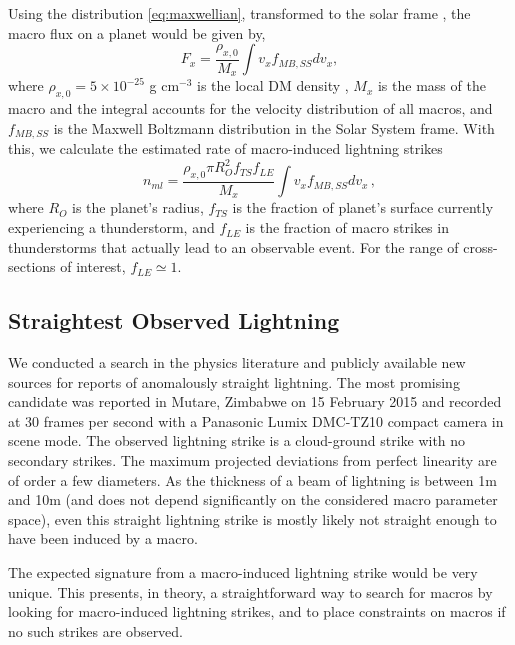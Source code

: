 \documentclass[%
reprint,
 amsmath,amssymb,
 aps,
 prd,
]{revtex4-2}
\begin{document}
    Using the distribution \eqref{eq:maxwellian}, transformed to the solar frame \citep{Freese2013}, the macro flux on a planet would be given by,
    \begin{equation}\label{eq:planet_macro_flux}
        F_{x} = \frac{\rho_{x,0}}{M_{x}} \int v_{x} f_{MB,SS} dv_x,
    \end{equation}
    where $\rho_{x,0} = 5 \times 10^{-25}$ g cm$^{-3}$ is the local DM density \cite{Bovy2012}, $M_{x}$ is the mass of the macro and the integral accounts for the velocity distribution of all macros, and $f_{MB,SS}$ is the Maxwell Boltzmann distribution in the Solar System frame. With this, we calculate the estimated rate of macro-induced lightning strikes
    \begin{equation}\label{eq:macro_lightning_rate}
        n_{ml} = \frac{\rho_{x,0} \pi R_{O}^2 f_{TS} f_{LE}}{M_{x}}\int v_{x} f_{MB,SS} dv_x\,,
    \end{equation}
    where $R_{O}$ is the planet's radius, $f_{TS}$ is the fraction of planet's surface currently experiencing a thunderstorm, and $f_{LE}$ is the fraction of macro strikes in thunderstorms that actually lead to an observable event. For the range of cross-sections of interest, $f_{LE}\simeq1$.

    \subsection{Straightest Observed Lightning} %
    \label{sub:straightest_observed_lightning}

        We conducted a search in the physics literature and publicly available new sources for reports of anomalously straight lightning. The most promising candidate was reported in Mutare, Zimbabwe on 15 February 2015 \cite{Zimbabwe} and recorded at 30 frames per second with a Panasonic Lumix DMC-TZ10 compact camera in scene mode. The observed lightning strike is a cloud-ground strike with no secondary strikes. The maximum projected deviations from perfect linearity are of order a few diameters. As the thickness of a beam of lightning is between 1m and 10m (and does not depend significantly on the considered macro parameter space), even this straight lightning strike is mostly likely not straight enough to have been induced by a macro.

        The expected signature from a macro-induced lightning strike would be very unique. This presents, in theory, a straightforward way to search for macros by looking for macro-induced lightning strikes, and to place constraints on macros if no such strikes are observed. 
\end{document}
